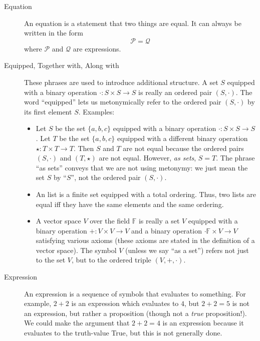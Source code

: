 \documentclass[12pt]{article}
\begin{document}
\begin{description}
  \item[Equation] An equation is a statement that two things are
    equal.  It can always be written in the form
    $$\mathcal{P}=\mathcal{Q}$$ where $\mathcal{P}$ and $\mathcal{Q}$
    are expressions.
    
  \item[Equipped, Together with, Along with] These phrases are
    used to introduce additional structure.  A set $S$ equipped with a
    binary operation $\cdot:S\times S\rightarrow S$ is really an
    ordered pair $(S,\cdot)$.  The word ``equipped'' lets us
    metonymically refer to the ordered pair $(S,\cdot)$ by its first
    element $S$.  Examples:
    \begin{itemize}
    \item Let $S$ be the set $\{a,b,c\}$ equipped with a binary
      operation $\cdot:S\times S\rightarrow S$.  Let $T$ be the set
      $\{a,b,c\}$ equipped with a different binary operation $\star:
      T\times T\rightarrow T$.  Then $S$ and $T$ are not equal because
      the ordered pairs $(S,\cdot)$ and $(T,\star)$ are not equal.
      However, \textit{as sets}, $S=T$.  The phrase ``as sets''
      conveys that we are not using metonymy: we just mean the set $S$
      by ``$S$'', not the ordered pair $(S,\cdot)$. 
    \item An list is a finite set equipped with a total ordering.
      Thus, two lists are equal iff they have the same elements and
      the same ordering. 
    \item A vector space $V$ over the field $\mathbb{F}$ is really a
      set $V$ equipped with a binary operation $+:V\times V\rightarrow
      V$ and a binary operation $\cdot \mathbb{F}\times V\rightarrow
      V$ satisfying various axioms (these axioms are stated in the
      definition of a vector space).  The symbol $V$ (unless we say
      ``as a set'') refers not just to the set $V$, but to the ordered
      triple $(V, +, \cdot)$. 
    \end{itemize}

  \item[Expression] An expression is a sequence of symbols that
    evaluates to something.  For example, $2+2$ is an expression which
    evaluates to $4$, but $2+2=5$ is not an expression, but rather a
    proposition (though not a \textit{true} proposition!).  We could
    make the argument that $2+2=4$ is an expression because it
    evaluates to the truth-value True, but this is not generally done.


\end{description}
\end{document}
